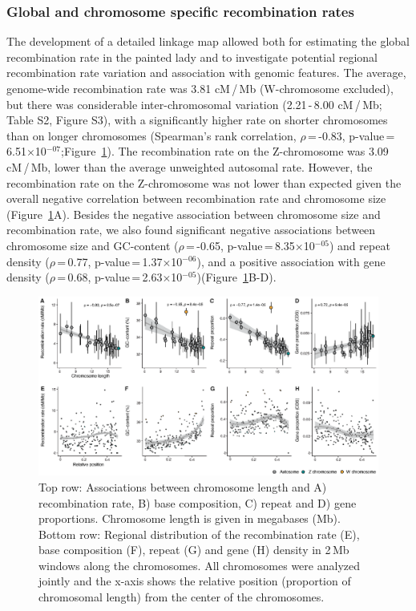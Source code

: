 \documentclass[twocolumn]{bmcart}%
\begin{document}
\subsubsection*{Global and chromosome specific recombination rates}
The development of a detailed linkage map allowed both for estimating the global recombination rate in the painted lady and to investigate potential regional recombination rate variation and association with genomic features. The average, genome-wide recombination rate was 3.81 cM\,/\,Mb (W-chromosome excluded), but there was considerable inter-chromosomal variation (2.21\,-\,8.00 cM\,/\,Mb; Table S2, Figure S3), with a significantly higher rate on shorter chromosomes than on longer chromosomes (Spearman’s rank correlation, $\rho$\,=\,-0.83, p-value\,=\,6.51$\times$10$^{-07}$;Figure~\ref{fig:4}). The recombination rate on the Z-chromosome was 3.09 cM\,/\,Mb, lower than the average unweighted autosomal rate. However, the recombination rate on the Z-chromosome was not lower than expected given the overall negative correlation between recombination rate and chromosome size (Figure~\ref{fig:4}A). Besides the negative association between chromosome size and  recombination rate, we also found significant negative associations between chromosome size and GC-content ($\rho$\,=\,-0.65, p-value\,=\,8.35$\times$10$^{-05}$) and repeat density ($\rho$\,=\,0.77, p-value\,=\,1.37$\times$10$^{-06}$), and a positive association with gene density ($\rho$\,=\,0.68, p-value\,=\,2.63$\times$10$^{-05}$)(Figure~\ref{fig:4}B-D). 

\begin{figure}[tb]
    \centering
\includegraphics[width =1.99\linewidth]{ShipilinaNasvallFig4opt.eps}
    \caption{Top row: Associations between chromosome length and A) recombination rate, B) base composition, C) repeat and D) gene proportions. Chromosome length is given in megabases (Mb). Bottom row: Regional distribution of the recombination rate (E), base composition (F), repeat (G) and gene (H) density in 2\,Mb windows along the chromosomes. All chromosomes were analyzed jointly and the x-axis shows the relative position (proportion of chromosomal length) from the center of the chromosomes.}
    \label{fig:4}
\end{figure}
\end{document}
